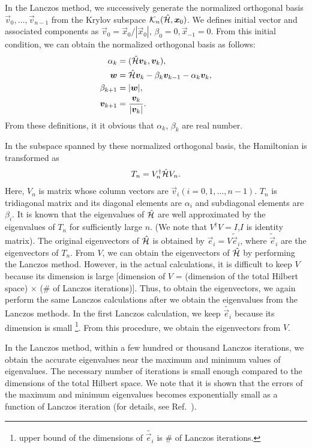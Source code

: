 In the Lanczos method,
we successively generate the normalized orthogonal basis 
${\vec{v}_{0},\dots,\vec{v}_{n-1}}$ from the Krylov subspace $\mathcal{K}_{n}(\hat{\mathcal{H}},\boldsymbol x_{0})$.
We defines initial vector and associated components as 
$\vec{v}_{0} =\vec{x}_{0}/|\vec{x}_{0}|$,
$\beta_{0}=0,\vec{x}_{-1}=0$.
From this initial condition,
we can obtain the normalized orthogonal basis  as follows:
\begin{align}
\alpha_{k} &= (\hat{\mathcal{H}}\boldsymbol v_{k},\boldsymbol v_{k}), \\
\boldsymbol w   &= \hat{\mathcal{H}}\boldsymbol v_{k}-\beta_{k}\boldsymbol v_{k-1}-\alpha_{k}\boldsymbol v_{k}, \\
\beta_{k+1} &= |\boldsymbol w|, \\
\boldsymbol v_{k+1} &= \frac{\boldsymbol v_{k}}{|\boldsymbol v_{k}|}.
\end{align}
From these definitions, it it obvious that $\alpha_{k}$, $\beta_{k}$ are real number.

In the subspace spanned by these normalized orthogonal basis,
the Hamiltonian is transformed as
\begin{align}
T_{n}=V_{n}^{\dagger}\hat{\mathcal{H}} V_{n}.
\end{align}
Here,
$V_{n}$ is matrix whose column vectors are 
$\vec{v}_{i}(i=0,1,\dots,n-1)$.
$T_{n}$ is tridiagonal matrix and its diagonal elements
are $\alpha_{i}$ and
subdiagonal elements are $\beta_{i}$.
It is known that
the eigenvalues of $\hat{\mathcal{H}}$ are well approximated by 
the eigenvalues of $T_{n}$ for sufficiently large $n$.
(We note that $V^{\dagger}V=I$,$I$ is identity matrix).
The original eigenvectors of $\hat{\mathcal{H}}$ is obtained 
by $\vec{e}_{i}=V\tilde{\vec{e}}_{i}$,
where  $\tilde{\vec{e}}_{i}$ are
the eigenvectors of $T_{n}$.
From $V$, 
we can obtain the eigenvectors of $\hat{\mathcal{H}}$
by performing the Lanczos method.
However, in the actual calculations,
it is difficult to keep $V$ because its dimension
is large [dimension of $V$ = (dimension of the total Hilbert space) $\times$ ($\#$ of Lanczos iterations)].
Thus, to obtain the eigenvectors, 
we again perform the same Lanczos calculations
after we obtain the eigenvalues from the Lanczos methods.
In the first Lanczos calculation, we keep $\tilde{\vec{e}_{i}}$
because its dimension is small
\footnote{upper bound of the dimensions of $\tilde{\vec{e}_{i}}$ is $\#$ of Lanczos iterations.}.
From this procedure, we obtain the eigenvectors  from $V$.

In the Lanczos method,
within a few hundred or thousand Lanczos iterations,
we obtain the accurate eigenvalues near the maximum and minimum values of eigenvalues.
The necessary number of iterations is small enough 
compared to the dimensions
of the total Hilbert space.
We note that it is shown that
the errors of the maximum and minimum eigenvalues
becomes exponentially small as a function of Lanczos iteration 
(for details, see Ref.~\cite{SugiharaMurota_en}).

